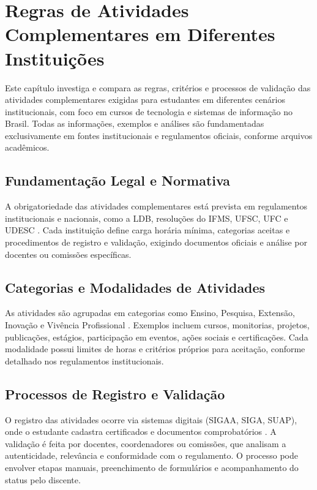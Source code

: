 \chapter{Regras de Atividades Complementares em Diferentes Instituições}

Este capítulo investiga e compara as regras, critérios e processos de validação das atividades complementares exigidas para estudantes em diferentes cenários institucionais, com foco em cursos de tecnologia e sistemas de informação no Brasil. Todas as informações, exemplos e análises são fundamentadas exclusivamente em fontes institucionais e regulamentos oficiais, conforme arquivos acadêmicos.
\section{Fundamentação Legal e Normativa}
A obrigatoriedade das atividades complementares está prevista em regulamentos institucionais e nacionais, como a LDB, resoluções do IFMS, UFSC, UFC e UDESC \cite{ufsc_sistemas_2024, bayde_ribeiro_sistemas_2022, udesc_atividades_2012}. Cada instituição define carga horária mínima, categorias aceitas e procedimentos de registro e validação, exigindo documentos oficiais e análise por docentes ou comissões específicas.

\section{Categorias e Modalidades de Atividades}
As atividades são agrupadas em categorias como Ensino, Pesquisa, Extensão, Inovação e Vivência Profissional \cite{ufsc_sistemas_2024, bayde_ribeiro_sistemas_2022, udesc_atividades_2012}. Exemplos incluem cursos, monitorias, projetos, publicações, estágios, participação em eventos, ações sociais e certificações. Cada modalidade possui limites de horas e critérios próprios para aceitação, conforme detalhado nos regulamentos institucionais.

\section{Processos de Registro e Validação}
O registro das atividades ocorre via sistemas digitais (SIGAA, SIGA, SUAP), onde o estudante cadastra certificados e documentos comprobatórios \cite{bayde_ribeiro_sistemas_2022, udesc_atividades_2012}. A validação é feita por docentes, coordenadores ou comissões, que analisam a autenticidade, relevância e conformidade com o regulamento. O processo pode envolver etapas manuais, preenchimento de formulários e acompanhamento do status pelo discente.

